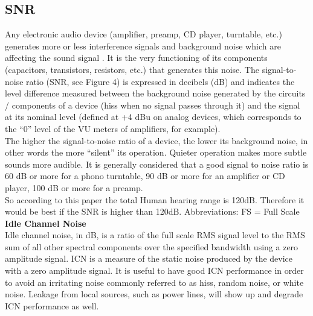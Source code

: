             \subsection{SNR}
            Any electronic audio device (amplifier, preamp, CD player, turntable, etc.) generates more or less interference signals and background noise which are affecting the sound signal . It is the very functioning of its components (capacitors, transistors, resistors, etc.) that generates this noise.
The signal-to-noise ratio (SNR, see Figure 4) is expressed in decibels (dB) and indicates the level difference measured between the background noise generated by the circuits / components of a device (hiss when no signal passes through it) and the signal at its nominal level (defined at +4 dBu on analog devices, which corresponds to the “0” level of the VU meters of amplifiers, for example).\\
The higher the signal-to-noise ratio of a device, the lower its background noise, in other words the more “silent” its operation. Quieter operation makes more subtle sounds more audible.
It is generally considered that a good signal to noise ratio is 60 dB or more for a phono turntable, 90 dB or more for an amplifier or CD player, 100 dB or more for a preamp.\\

So according to this paper the total Human hearing range is 120dB. Therefore it would be best if the SNR is higher than 120dB.
Abbreviations: FS = Full Scale\\

\textbf{Idle Channel Noise}\\
Idle channel noise, in dB, is a ratio of the full scale RMS signal level to the RMS sum of all other spectral components over the specified bandwidth using a zero amplitude signal. ICN is a measure of the static noise produced by the device with a zero amplitude signal. It is useful to have good ICN performance in order to avoid an irritating noise commonly referred to as hiss, random noise, or white noise. Leakage from local sources, such as power lines, will show up and degrade ICN performance as well.\\

